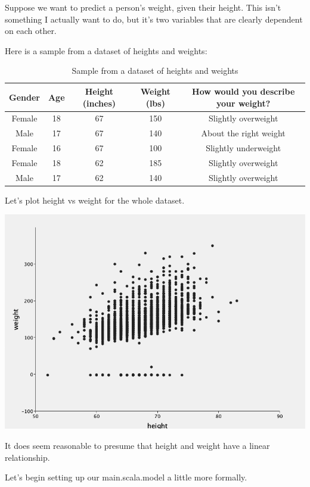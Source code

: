 \documentclass[12pt]{article}
\begin{document}
Suppose we want to predict a person's weight, given their height. This isn't something I actually want to do, but it's two variables that are clearly dependent on each other.

Here is a sample from a dataset of heights and weights:
\begin{table}[htp]
\caption{Sample from a dataset of heights and weights}
\begin{center}
\begin{tabular}{|c|c|c|c|c|}
\hline
Gender & Age & Height (inches) & Weight (lbs) & How would you describe your weight? \\ \hline
Female & 18 & 67 & 150 & Slightly overweight \\
Male & 17 & 67 & 140 & About the right weight \\
Female & 16 & 67 & 100 & Slightly underweight \\
Female & 18 & 62 & 185 & Slightly overweight \\
Male & 17 & 62 & 140 & Slightly overweight \\
\hline
\end{tabular}
\end{center}
\label{Sample from a dataset of heights and weights}
\end{table}%

Let's plot height vs weight for the whole dataset.

\includegraphics[width={\textwidth}]{height-weight}

It does seem reasonable to presume that height and weight have a linear relationship. 

Let's begin setting up our main.scala.model a little more formally.
\end{document}
